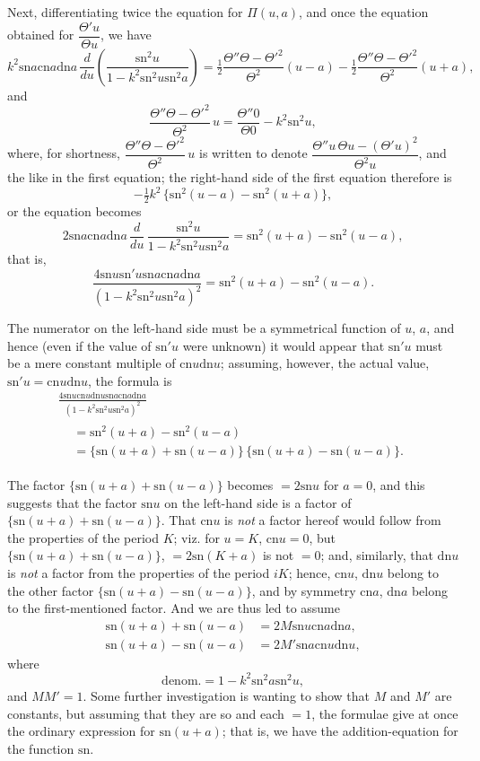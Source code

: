 \documentclass[11pt,a4paper]{book}
\providecommand{\sn}{\mathrm{sn}}
\providecommand{\cn}{\mathrm{cn}}
\providecommand{\dn}{\mathrm{dn}}
\begin{document}
Next, differentiating twice the equation for $\Pi(u, a)$, and once the equation obtained
for $\dfrac{\Theta' u}{\Theta u}$, we have
%
\[
k^2 \sn a \cn a \dn a \, \frac{d}{du}
\left( \frac{\sn^2 u}{1 - k^2 \sn^2 u \sn^2 a} \right)
= \tfrac{1}{2} \frac{\Theta'' \Theta - \Theta'^2}{\Theta^2} (u - a)
- \tfrac{1}{2} \frac{\Theta'' \Theta - \Theta'^2}{\Theta^2} (u + a),
\]
%
and
%
\[
\frac{\Theta'' \Theta - \Theta'^2}{\Theta^2} \, u
= \frac{\Theta'' 0}{\Theta 0} - k^2 \sn^2 u,
\]
%
where, for shortness,
$\dfrac{\Theta'' \Theta - \Theta'^2}{\Theta^2} \, u$
is written to denote
$\dfrac{\Theta'' u \, \Theta u - (\Theta' u)^2}{\Theta^2 u}$,
and the like in the first equation; the right-hand side of the first equation therefore is
%
\[
- \tfrac{1}{2} k^2 \, \{ \sn^2 (u - a) - \sn^2 (u + a) \},
\]
%
or the equation becomes
%
\[
2 \sn a \cn a \dn a \, \frac{d}{du} \,
\frac{\sn^2 u}{1 - k^2 \sn^2 u \sn^2 a}
= \sn^2 (u + a) - \sn^2 (u - a),
\]
%
that is,
%
\[
\frac{4 \sn u \sn' u \sn a \cn a \dn a}
{(1 - k^2 \sn^2 u \sn^2 a)^2}
= \sn^2 (u + a) - \sn^2 (u - a).
\]

The numerator on the left-hand side must be a symmetrical function of $u$, $a$,
and hence (even if the value of $\sn' u$ were unknown) it would appear that $\sn' u$ must
be a mere constant multiple of $\cn u \dn u$; assuming, however, the actual value,
$\sn' u = \cn u \dn u$, the formula is
%
\begin{multline*}
\frac{4 \sn u \cn u \dn u \sn a \cn a \dn a}
{(1 - k^2 \sn^2 u \sn^2 a)^2} \\
\begin{aligned}
&= \sn^2 (u + a) - \sn^2 (u - a) \\
&= \{ \sn (u + a) + \sn (u - a) \} \, \{ \sn (u + a) - \sn (u - a) \}.
\end{aligned}
\end{multline*}

The factor $\{ \sn (u + a) + \sn (u - a) \}$ becomes $= 2 \sn u$ for $a = 0$,
and this suggests that the factor $\sn u$ on the left-hand side is a factor of
$\{ \sn (u + a) + \sn (u - a) \}$. That $\cn u$ is \textit{not} a factor hereof
would follow from the properties of the period $K$; viz. for $u = K$, $\cn u = 0$,
but $\{ \sn (u + a) + \sn (u - a) \}$, $= 2 \sn (K + a)$ is not $= 0$;
and, similarly, that $\dn u$ is \textit{not} a factor from the properties of the
period $iK$; hence, $\cn u$, $\dn u$ belong to the other factor
$\{ \sn (u + a) - \sn (u - a) \}$, and by symmetry $\cn a$, $\dn a$ belong to the
first-mentioned factor. And we are thus led to assume
%
\begin{align*}
\sn (u + a) + \sn (u - a) &= 2M \sn u \cn a \dn a, \\
\sn (u + a) - \sn (u - a) &= 2M' \sn a \cn u \dn u,
\end{align*}
%
where
%
\[
\text{denom.} = 1 - k^2 \sn^2 a \sn^2 u,
\]
%
and $MM' = 1$. Some further investigation is wanting to show that $M$ and $M'$
are constants, but assuming that they are so and each $= 1$, the formulae give
at once the ordinary expression for $\sn (u + a)$; that is, we have the
addition-equation for the function $\sn$.
\end{document}
